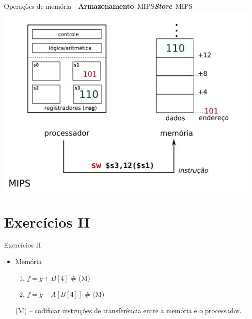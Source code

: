 \begin{frame}{Operações de memória - {\bf Armazenamento}--MIPS}{{\em\bf Store}--MIPS}
\includegraphics[scale=0.7]{instr_mem_store_mips.png}
\end{frame}


\section{Exercícios II}

\def\mem{{\footnotesize\color{gray}\# (M)}}
\begin{frame}{Exercícios II}
  \large

\begin{itemize}
\item Memória
  \begin{enumerate}
  \item $f = g + B[4]$ \mem
  \item $ f = g - A[B[4]]$ \mem
  \end{enumerate}

  \bigskip
  {\footnotesize (M) -- codificar instruções de transferência entre a
    memória e o processador.}
  
\end{itemize}

\end{frame}


\section{\insertlecture}

